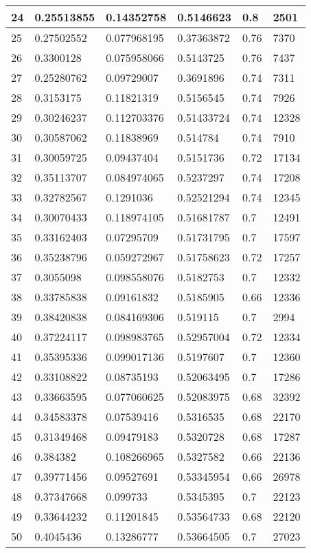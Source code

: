 \begin{longtable}{|l|l|l|l|l|l|}
24 & 0.25513855 & 0.14352758 & 0.5146623 & 0.8 & 2501 \\ \hline 
25 & 0.27502552 & 0.077968195 & 0.37363872 & 0.76 & 7370 \\ \hline 
26 & 0.3300128 & 0.075958066 & 0.5143725 & 0.76 & 7437 \\ \hline 
27 & 0.25280762 & 0.09729007 & 0.3691896 & 0.74 & 7311 \\ \hline 
28 & 0.3153175 & 0.11821319 & 0.5156545 & 0.74 & 7926 \\ \hline 
29 & 0.30246237 & 0.112703376 & 0.51433724 & 0.74 & 12328 \\ \hline 
30 & 0.30587062 & 0.11838969 & 0.514784 & 0.74 & 7910 \\ \hline 
31 & 0.30059725 & 0.09437404 & 0.5151736 & 0.72 & 17134 \\ \hline 
32 & 0.35113707 & 0.084974065 & 0.5237297 & 0.74 & 17208 \\ \hline 
33 & 0.32782567 & 0.1291036 & 0.52521294 & 0.74 & 12345 \\ \hline 
34 & 0.30070433 & 0.118974105 & 0.51681787 & 0.7 & 12491 \\ \hline 
35 & 0.33162403 & 0.07295709 & 0.51731795 & 0.7 & 17597 \\ \hline 
36 & 0.35238796 & 0.059272967 & 0.51758623 & 0.72 & 17257 \\ \hline 
37 & 0.3055098 & 0.098558076 & 0.5182753 & 0.7 & 12332 \\ \hline 
38 & 0.33785838 & 0.09161832 & 0.5185905 & 0.66 & 12336 \\ \hline 
39 & 0.38420838 & 0.084169306 & 0.519115 & 0.7 & 2994 \\ \hline 
40 & 0.37224117 & 0.098983765 & 0.52957004 & 0.72 & 12334 \\ \hline 
41 & 0.35395336 & 0.099017136 & 0.5197607 & 0.7 & 12360 \\ \hline 
42 & 0.33108822 & 0.08735193 & 0.52063495 & 0.7 & 17286 \\ \hline 
43 & 0.33663595 & 0.077060625 & 0.52083975 & 0.68 & 32392 \\ \hline 
44 & 0.34583378 & 0.07539416 & 0.5316535 & 0.68 & 22170 \\ \hline 
45 & 0.31349468 & 0.09479183 & 0.5320728 & 0.68 & 17287 \\ \hline 
46 & 0.384382 & 0.108266965 & 0.5327582 & 0.66 & 22136 \\ \hline 
47 & 0.39771456 & 0.09527691 & 0.53345954 & 0.66 & 26978 \\ \hline 
48 & 0.37347668 & 0.099733 & 0.5345395 & 0.7 & 22123 \\ \hline 
49 & 0.33644232 & 0.11201845 & 0.53564733 & 0.68 & 22120 \\ \hline 
50 & 0.4045436 & 0.13286777 & 0.53664505 & 0.7 & 27023 \\ \hline 
\end{longtable}